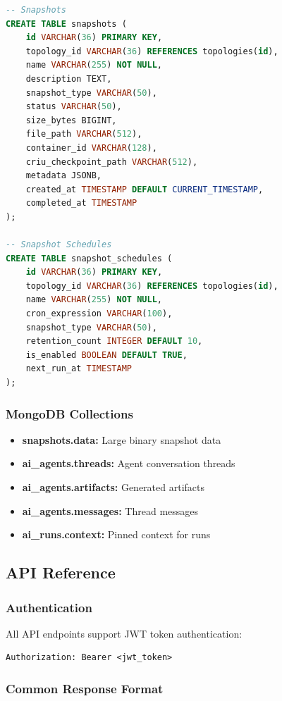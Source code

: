 \documentclass[10pt,a4paper]{article}
\begin{document}
\begin{lstlisting}[language=sql, caption=Core Tables]
-- Snapshots
CREATE TABLE snapshots (
    id VARCHAR(36) PRIMARY KEY,
    topology_id VARCHAR(36) REFERENCES topologies(id),
    name VARCHAR(255) NOT NULL,
    description TEXT,
    snapshot_type VARCHAR(50),
    status VARCHAR(50),
    size_bytes BIGINT,
    file_path VARCHAR(512),
    container_id VARCHAR(128),
    criu_checkpoint_path VARCHAR(512),
    metadata JSONB,
    created_at TIMESTAMP DEFAULT CURRENT_TIMESTAMP,
    completed_at TIMESTAMP
);

-- Snapshot Schedules
CREATE TABLE snapshot_schedules (
    id VARCHAR(36) PRIMARY KEY,
    topology_id VARCHAR(36) REFERENCES topologies(id),
    name VARCHAR(255) NOT NULL,
    cron_expression VARCHAR(100),
    snapshot_type VARCHAR(50),
    retention_count INTEGER DEFAULT 10,
    is_enabled BOOLEAN DEFAULT TRUE,
    next_run_at TIMESTAMP
);
\end{lstlisting}

\subsubsection{MongoDB Collections}

\begin{itemize}
\item \textbf{snapshots.data:} Large binary snapshot data
\item \textbf{ai\_agents.threads:} Agent conversation threads
\item \textbf{ai\_agents.artifacts:} Generated artifacts
\item \textbf{ai\_agents.messages:} Thread messages
\item \textbf{ai\_runs.context:} Pinned context for runs
\end{itemize}

\subsection{API Reference}

\subsubsection{Authentication}

All API endpoints support JWT token authentication:

\begin{lstlisting}[language=http]
Authorization: Bearer <jwt_token>
\end{lstlisting}

\subsubsection{Common Response Format}
\end{document}
